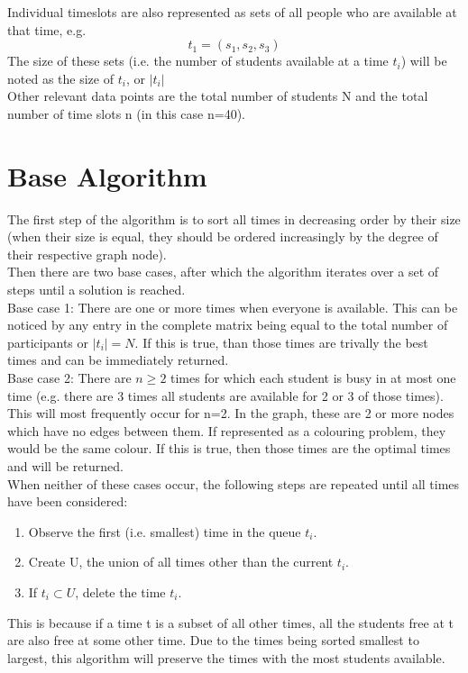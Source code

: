 \documentclass[12pt, a4paper]{article}
\begin{document}
Individual timeslots are also represented as sets of all people who are available at that time, e.g. \[t_1 = (s_1, s_2, s_3)\]
The size of these sets (i.e. the number of students available at a time $t_i$) will be noted as the size of $t_i$, or $|t_i|$\\

Other relevant data points are the total number of students N and the total number of time slots n (in this case n=40).

\section{Base Algorithm}
The first step of the algorithm is to sort all times in decreasing order by their size (when their size is equal, they should be ordered increasingly by the degree of their respective graph node). \\

Then there are two base cases, after which the algorithm iterates over a set of steps until a solution is reached.\\

Base case 1: There are one or more times when everyone is available. This can be noticed by any entry in the complete matrix being equal to the total number of participants or $|t_i|=N$. If this is true, than those times are trivally the best times and can be immediately returned.\\

Base case 2: There are $n \geq 2$ times for which each student is busy in at most one time (e.g. there are 3 times \textrightarrow{} all students are available for 2 or 3 of those times). This will most frequently occur for n=2.
 In the graph, these are 2 or more nodes which have no edges between them. If represented as a colouring problem, they would be the same colour. If this is true, then those times are the optimal times and will be returned. \\  

When neither of these cases occur, the following steps are repeated until all times have been considered: \\
\begin{enumerate}
\item Observe the first (i.e. smallest) time in the queue $t_i$.
\item Create U, the union of all times other than the current $t_i$.
\item If $t_i \subset U$, delete the time $t_i$. 
\end{enumerate}
This is because if a time t is a subset of all other times, all the students free at t are also free at some other time. Due to the times being sorted smallest to largest, this algorithm will preserve the times with the most students available.
\end{document}
